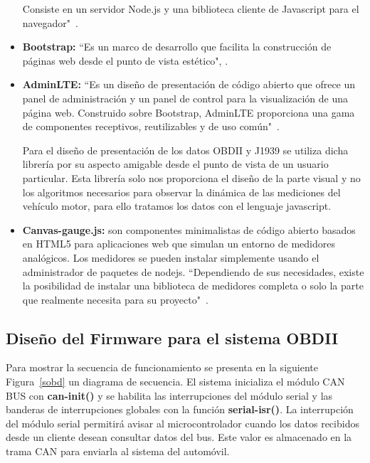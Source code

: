 \begin{itemize}
	Consiste en  un servidor Node.js y una biblioteca cliente de Javascript para el navegador"~\cite{socket}. %
	\item {\bfseries Bootstrap: } ``Es un marco de desarrollo que facilita la construcción de páginas web desde el punto de vista estético", \cite{boot}. %
	\item {\bfseries AdminLTE: } ``Es un diseño de presentación  de código abierto que ofrece un  panel de administración y  un panel de control para la visualización de una página web. 
	Construido sobre Bootstrap, AdminLTE proporciona una gama de componentes receptivos, reutilizables y de uso común"~\cite{admin}. %
	
	Para el diseño de presentación de los datos OBDII y J1939 se utiliza dicha librería por su aspecto amigable desde el punto de vista de un usuario particular. 
	Esta librería solo nos proporciona el diseño de la parte visual y no los algoritmos necesarios para observar la dinámica de las mediciones del vehículo motor, para ello tratamos los datos con el lenguaje javascript. 
	
	\item {\bfseries Canvas-gauge.js:} son componentes minimalistas de código abierto basados en HTML5 para aplicaciones web que simulan un entorno de medidores analógicos. 
	Los medidores  se pueden instalar simplemente usando el administrador de paquetes de nodejs. ``Dependiendo de sus necesidades, existe la posibilidad de instalar una biblioteca de medidores completa o solo la parte que realmente necesita para su proyecto"~\cite{gauge}. %
	
\end{itemize}


\subsection{Diseño del Firmware para el sistema OBDII}

Para mostrar la secuencia de funcionamiento se presenta en la siguiente  Figura~\ref{sobd} un diagrama de secuencia. 
El sistema inicializa el módulo CAN BUS con {\bfseries can-init()} y se habilita las interrupciones del módulo serial y las banderas de interrupciones globales con la función {\bfseries serial-isr()}. 
La interrupción del módulo serial permitirá avisar al microcontrolador cuando los datos recibidos desde un cliente desean consultar datos del bus. 
Este valor es almacenado en la trama CAN para enviarla al sistema del automóvil.

